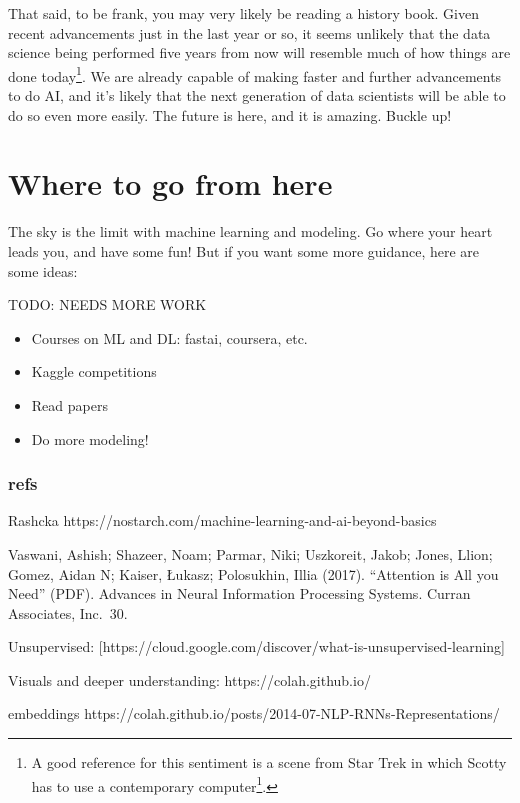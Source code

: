 \documentclass[
  letterpaper,
]{krantz}
\providecommand{\tightlist}{%
  \setlength{\itemsep}{0pt}\setlength{\parskip}{0pt}}\usepackage{longtable,booktabs,array}
\DeclareRobustCommand{\href}[2]{#2\footnote{\url{#1}}}
\begin{document}
That said, to be frank, you may very likely be reading a history book.
Given recent advancements just in the last year or so, it seems unlikely
that the data science being performed five years from now will resemble
much of how things are done today\footnote{A good reference for this
  sentiment is a scene from Star Trek in which
  \href{https://www.youtube.com/watch?v=hShY6xZWVGE}{Scotty has to use a
  contemporary computer}.}. We are already capable of making faster and
further advancements to do AI, and it's likely that the next generation
of data scientists will be able to do so even more easily. The future is
here, and it is amazing. Buckle up!

\section{Where to go from here}\label{where-to-go-from-here-2}

The sky is the limit with machine learning and modeling. Go where your
heart leads you, and have some fun! But if you want some more guidance,
here are some ideas:

TODO: NEEDS MORE WORK

\begin{itemize}
\tightlist
\item
  Courses on ML and DL: fastai, coursera, etc.
\item
  Kaggle competitions
\item
  Read papers
\item
  Do more modeling!
\end{itemize}

\subsubsection{refs}\label{refs-3}

Rashcka https://nostarch.com/machine-learning-and-ai-beyond-basics

Vaswani, Ashish; Shazeer, Noam; Parmar, Niki; Uszkoreit, Jakob; Jones,
Llion; Gomez, Aidan N; Kaiser, Łukasz; Polosukhin, Illia (2017).
``Attention is All you Need'' (PDF). Advances in Neural Information
Processing Systems. Curran Associates, Inc.~30.

Unsupervised:
{[}https://cloud.google.com/discover/what-is-unsupervised-learning{]}

Visuals and deeper understanding: https://colah.github.io/

embeddings
https://colah.github.io/posts/2014-07-NLP-RNNs-Representations/
\end{document}
